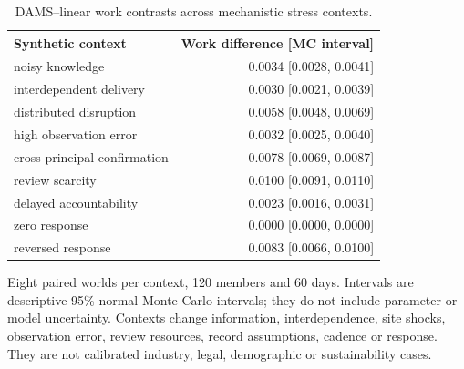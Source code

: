 \begin{table}[tbp]
\centering\small
\caption{DAMS--linear work contrasts across mechanistic stress contexts.}
\label{tab:context-results}
\begin{tabular}{lr}
\toprule
Synthetic context & Work difference [MC interval] \\
\midrule
noisy knowledge & 0.0034 [0.0028, 0.0041] \\
interdependent delivery & 0.0030 [0.0021, 0.0039] \\
distributed disruption & 0.0058 [0.0048, 0.0069] \\
high observation error & 0.0032 [0.0025, 0.0040] \\
cross principal confirmation & 0.0078 [0.0069, 0.0087] \\
review scarcity & 0.0100 [0.0091, 0.0110] \\
delayed accountability & 0.0023 [0.0016, 0.0031] \\
zero response & 0.0000 [0.0000, 0.0000] \\
reversed response & 0.0083 [0.0066, 0.0100] \\
\bottomrule
\end{tabular}
\par\smallskip\begin{minipage}{0.96\textwidth}\footnotesize Eight paired worlds per context, 120 members and 60 days. Intervals are descriptive 95\% normal Monte Carlo intervals; they do not include parameter or model uncertainty. Contexts change information, interdependence, site shocks, observation error, review resources, record assumptions, cadence or response. They are not calibrated industry, legal, demographic or sustainability cases.\end{minipage}
\end{table}
